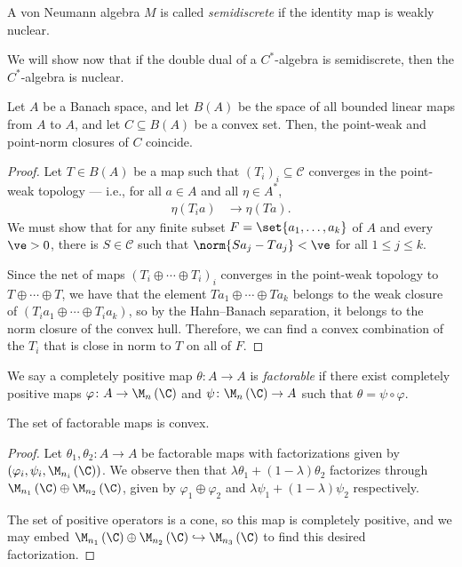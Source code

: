 \documentclass[10pt]{mypackage}
\begin{document}
\begin{definition}
   A von Neumann algebra $M$ is called \textit{semidiscrete} if the identity map is weakly nuclear.
\end{definition}
We will show now that if the double dual of a $C^{\ast}$-algebra is semidiscrete, then the $C^{\ast}$-algebra is nuclear.
\begin{lemma}
  Let $A$ be a Banach space, and let $B(A)$ be the space of all bounded linear maps from $A$ to $A$, and let $C\subseteq B(A)$ be a convex set. Then, the point-weak and point-norm closures of $C$ coincide.
\end{lemma}
\begin{proof}
  Let $T\in B(A)$ be a map such that $\left( T_i \right)_i\subseteq \mathcal{C}$ converges in the point-weak topology --- i.e., for all $a\in A$ and all $\eta\in A^{\ast}$,
  \begin{align*}
    \eta\left( T_ia \right) &\rightarrow \eta\left( Ta \right).
  \end{align*}
  We must show that for any finite subset $F = \set{a_1,\dots,a_k}$ of $A$ and every $\ve > 0$, there is $S\in \mathcal{C}$ such that $\norm{Sa_j - Ta_j} < \ve$ for all $1\leq j \leq k$.

  Since the net of maps $\left( T_i\oplus\cdots\oplus T_i \right)_{i}$ converges in the point-weak topology to $ T\oplus\cdots\oplus T $, we have that the element $ Ta_1\oplus\cdots\oplus Ta_k $ belongs to the weak closure of $\left( T_ia_1\oplus\cdots\oplus T_ia_k \right)$, so by the Hahn--Banach separation, it belongs to the norm closure of the convex hull. Therefore, we can find a convex combination of the $T_i$ that is close in norm to $T$ on all of $F$.
\end{proof}
\begin{definition}
  We say a completely positive map $\theta\colon A\rightarrow A$ is \textit{factorable} if there exist completely positive maps $\varphi\colon A\rightarrow \M_n\left( \C \right)$ and $\psi\colon \M_n\left( \C \right)\rightarrow A$ such that $\theta = \psi\circ\varphi$.
\end{definition}
\begin{proposition}
  The set of factorable maps is convex.
\end{proposition}
\begin{proof}
  Let $\theta_1,\theta_2\colon A\rightarrow A$ be factorable maps with factorizations given by $\left( \varphi_i,\psi_i,\M_{n_i}\left(\C\right) \right)$. We observe then that $\lambda \theta_1 + \left( 1-\lambda \right)\theta_2$ factorizes through $\M_{n_1}\left( \C \right)\oplus \M_{n_2}\left( \C \right)$, given by $\varphi_1\oplus \varphi_2$ and $\lambda \psi_1 + \left( 1-\lambda \right)\psi_2$ respectively.

  The set of positive operators is a cone, so this map is completely positive, and we may embed $\M_{n_1}\left( \C \right)\oplus \M_{n_2}\left( \C \right)\hookrightarrow \M_{n_3}\left( \C \right)$ to find this desired factorization.
\end{proof}
\end{document}
